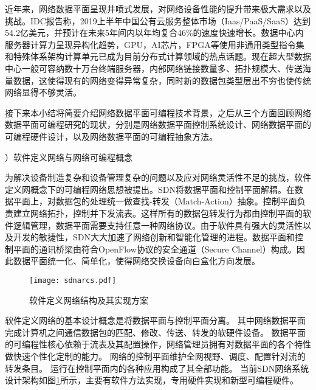 \label{chap12}

近年来，网络数据平面呈现井喷式发展，对网络设备性能的提升带来极大需求以及挑战。IDC报告称，2019上半年中国公有云服务整体市场（Iaas/PaaS/SaaS）达到54.2亿美元，并预计在未来5年间内以年均复合46\%的速度快速增长。数据中心内服务器计算力呈现异构化趋势，GPU，AI芯片，FPGA等使用非通用类型指令集和特殊体系架构计算单元已成为目前分布式计算领域的热点话题。现在超大型数据中心一般可容纳数十万台终端服务器，内部网络链接数量多、拓扑规模大、传送海量数据，这使得现有的网络变得异常复杂，同时新的数据包类型层出不穷也使传统网络显得不够灵活。

接下来本小结将简要介绍网络数据平面可编程技术背景，之后从三个方面回顾网络数据平面可编程研究的现状，分别是网络数据平面控制系统设计、网络数据平面的可编程硬件设计，以及网络数据平面的可编程抽象方法。

\label{chap1125}

{）软件定义网络与网络可编程概念}

为解决设备制造复杂和设备管理复杂的问题以及应对网络灵活性不足的挑战，软件定义网概念下的可编程网络思想被提出。SDN将数据平面和控制平面解耦。在数据平面上，对数据包的处理统一做查找-转发（Match-Action）抽象。控制平面负责建立网络拓扑，控制并下发流表。这样所有的数据包转发行为都由控制平面的软件逻辑管理，数据平面需要支持任意一种网络协议。由于软件具有强大的灵活性以及开发的敏捷性，SDN大大加速了网络创新和智能化管理的进程。数据平面和控制平面的通讯桥梁由符合OpenFlow协议的安全通道（Secure Channel）构成。因此数据平面统一化、简单化，使得网络交换设备向白盒化方向发展。	

\begin{figure}[!ht]
	\centering 
	\vspace{-1.5mm} 
	\texttt{[image: sdnarcs.pdf]}
	\caption{软件定义网络结构及其实现方案} \label{fig:sdnarcs}
\end{figure}

软件定义网络的基本设计概念是将数据平面与控制平面分离。
其中网络数据平面完成计算机之间通信数据包的匹配、修改、传送、转发的软硬件设备。
数据平面的可编程性核心依赖于流表及其配置操作，网络管理员拥有对数据平面的各个特性做快速个性化定制的能力。
网络的控制平面维护全网视野、调度、配置针对流的转发条目。
运行在控制平面内的各种应用构成了其全部功能。
当前SDN网络系统设计架构如图\ref{fig:sdnarcs}所示，主要有软件方法实现，专用硬件实现和新型可编程硬件。



